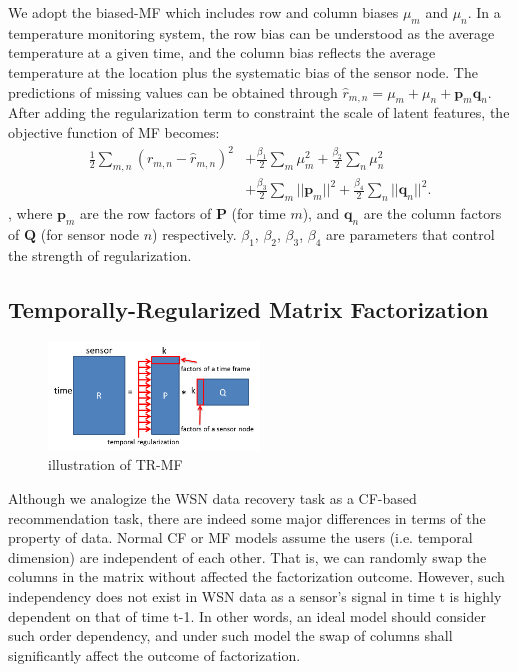 We adopt the biased-MF which includes row and column biases $\mu_m$ and $\mu_n$. %
In a temperature monitoring system, the row bias can be understood as the average temperature at a given time, and the column bias reflects the average temperature at the location plus the systematic bias of the sensor node.
The predictions of missing values can be obtained through $\hat{r}_{m,n} = \mu_m + \mu_n + \mathbf{p}_m \mathbf{q}_n$.
After adding the regularization term to constraint the scale of latent features, the objective function of MF becomes:
\begin{equation*}\begin{aligned}
\frac{1}{2}\sum_{m,n}{(r_{m,n} - \hat{r}_{m,n})}^2 & + \frac{\beta_1}{2}\sum_m{\mu_m^2} + \frac{\beta_2}{2}\sum_n{\mu_n^2}\\
& + \frac{\beta_3}{2}\sum_m{||\mathbf{p}_m||^2} + \frac{\beta_4}{2}\sum_n{||\mathbf{q}_n||^2}.
\end{aligned}\end{equation*}
, where $\mathbf{p}_m$ are the row factors of $\mathbf{P}$ (for time $m$), and $\mathbf{q}_n$ are the column factors of $\mathbf{Q}$ (for sensor node $n$) respectively.
$\beta_1$, $\beta_2$, $\beta_3$, $\beta_4$ are parameters that control the strength of regularization.

\subsection{Temporally-Regularized Matrix Factorization}

\begin{figure}[htbp]
	\centering
	\includegraphics[width=0.5\textwidth]{TRMF_illustration.png}
	\caption{illustration of TR-MF}
\end{figure}


Although we analogize the WSN data recovery task as a CF-based recommendation task, there are indeed some major differences in terms of the property of data.
Normal CF or MF models assume the users (i.e. temporal dimension) are independent of each other. That is, we can randomly swap the columns in the matrix without affected the factorization outcome. However, such independency does not exist in WSN data as a sensor's signal in time t is highly dependent on that of time t-1. In other words, an ideal model should consider such order dependency, and under such model the swap of columns shall significantly affect the outcome of factorization.

